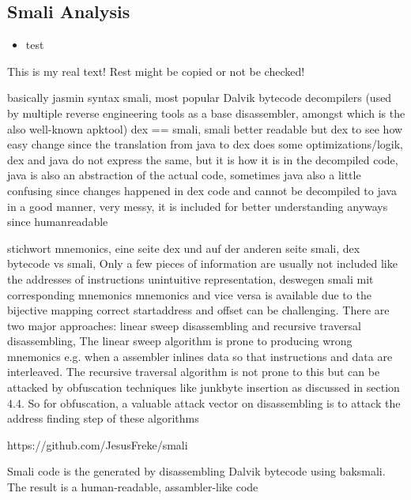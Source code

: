 \subsection{Smali Analysis} \label{subsection:tools-baksmali}
\begin{itemize}
    \item test
\end{itemize}
This is my real text! Rest might be copied or not be checked!

basically jasmin syntax
%
smali, most popular Dalvik bytecode decompilers (used by multiple reverse engineering tools as a base disassembler, amongst which is the also well-known apktool)
\cite{kovachevaMaster}
%
dex == smali, smali better readable but dex to see how easy change
since the translation from java to dex does some optimizations/logik, dex and java do not express the same, but it is how it is in the decompiled code, java is also an abstraction of the actual code, sometimes java also a little confusing since changes happened in dex code and cannot be decompiled to java in a good manner, very messy, it is included for better understanding anyways since humanreadable


stichwort mnemonics, eine seite dex und auf der anderen seite smali, dex bytecode vs smali, Only a few pieces of information are usually not included like the addresses of instructions\newline
unintuitive representation, deswegen smali mit corresponding mnemonics\newline
mnemonics and vice versa is available due to the bijective mapping\newline
correct startaddress and offset can be challenging. There are two major approaches: linear sweep disassembling and recursive traversal disassembling, The linear sweep algorithm is prone to producing wrong mnemonics e.g. when a assembler inlines data so that instructions and data are interleaved. The recursive traversal algorithm is not prone to this but can be attacked by obfuscation techniques like junkbyte insertion as discussed in section 4.4. So for obfuscation, a valuable attack vector on disassembling is to attack the address finding step of these algorithms\newline

https://github.com/JesusFreke/smali

Smali code is the generated by disassembling Dalvik bytecode using baksmali. The result is a human-readable, assambler-like code

